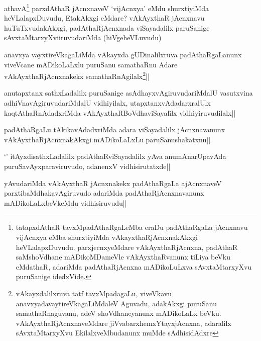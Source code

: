 
\begin{artha}
athavA\footnote{tatapxdAthaR tavxMpadAthaRgaLeMba eraDu padAthaRgaLa jAcnxnavu vijAcnxya eMba shurxtiyiMda vAkayxthaRjAcnxnakAkxgi heVLalapxDuvudu. parxjecnxyeMdare vAkAyxthaRjAcnxna, padAthaR saMshoVdhane mADikoMDameVle vAkAyxthaRvanunx tiLiya beVku eMdathaR, adariMda padAthaRjAcnxna mADikoLuLxva sAvxtaMtarxyXvu puruSanige idedxVide.} parxdAthaR jAcnxnaveV `vijAcnxya' eMdu shurxtiyiMda heVLalapxDuvudu, EtakAkxgi eMdare? vAkAyxthaR jAcnxnavu huTuTxvudakAkxgi, padAthaRjAcnxnada viSayadalilx paruSanige sAvxtaMtarxyXviiruvudariMda (hiVgeheVLuvudu)
\end{artha}


\begin{artha}
anavxya vayxtireVkagaLiMda vAkayxda gUDinalilxruva padAthaRgaLanunx viveVcane mADikoLaLxlu puruSanu samathaRnu Adare vAkAyxthaRjAcnxnakekx samathaRnAgilalx\footnote{vAkayxdalilxruva tatf tavxMpadagaLu, viveVkavu anavxyadavaytireVkagaLiMdaleV Aguvadu, adakAkxgi puruSanu samathaRnaguvanu, adeV shoVdhaneyanunx mADikoLaLx beVku. vAkAyxthaRjAcnxnaveMdare jiVvabarxhemxYtayxjAcnxna, adaralilx sAvxtaMtarxyXvu EkilalxveMbudanunx muMde sAdhisidAdxre}||
\end{artha}

\begin{artha}
anutapxtanx sathxLadalilx puruSanige asAdhayxvAgiruvudariMdalU vasutxvina adhiVnavAgiruvudariMdalU vidhiyilalx, utapxtanxvAdadarxralUlx kaqtAthaRnAdadxriMda vAkAyxthaRBoVdhaviSayalilx vidhiyiruvudilalx||
\end{artha}

\begin{artha}
padAthaRgaLu tAkikavAdadxriMda adara viSayadalilx jAcnxnavanunx vAkAyxthaRjAcnxnakAkxgi mADikoLaLxLu paruSanushakatxnu||
\end{artha}

\begin{artha}
`\stext' itAyxdisathxLadalilx padAthaRviSayadalilx yAva anumAnarUpavAda puruSavAyxparaviruvudo, adanenxV vidhisirutatxde||
\end{artha}

\begin{artha}
yAvudariMda vAkAyxthaR jAcnxnakekx padAthaRgaLa ajAcnxnaveV parxtibaMdhakavAgiruvudo adariMda padAthaRjAcnxnavanunx mADikoLaLxbeVkeMdu vidhisiruvudu||
\end{artha}

